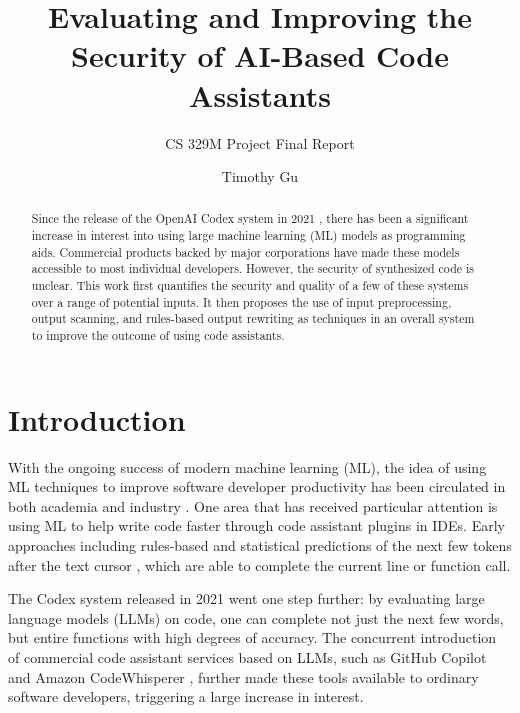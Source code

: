 \documentclass[sigplan,screen,nonacm]{acmart}
\begin{document}
\title{Evaluating and Improving the Security of AI-Based Code Assistants}
\subtitle{CS 329M Project Final Report}

\author{Timothy Gu}

\renewcommand{\shorttitle}{CS 329M Project Final Report}
\renewcommand{\shortauthors}{Gu}

\ifluatex
\renewcommand{\checkmark}{✔}
\fi

\begin{abstract}
    Since the release of the Open\-AI Codex system in 2021 \cite{Chen2021EvaluatingLL}, there has been a significant increase in interest into using large machine learning (ML) models as programming aids. Commercial products backed by major corporations have made these models accessible to most individual developers. However, the security of synthesized code is unclear. This work first quantifies the security and quality of a few of these systems over a range of potential inputs. It then proposes the use of input preprocessing, output scanning, and rules-based output rewriting as techniques in an overall system to improve the outcome of using code assistants.
\end{abstract}

\maketitle

\section{Introduction}

With the ongoing success of modern machine learning (ML), the idea of using ML techniques to improve software developer productivity has been circulated in both academia and industry \cite{pillars}. One area that has received particular attention is using ML to help write code faster through code assistant plugins in IDEs. Early approaches including rules-based and statistical predictions of the next few tokens after the text cursor \cite{kite-providers}, which are able to complete the current line or function call.

The Codex system released in 2021 \cite{Chen2021EvaluatingLL} went one step further: by evaluating large language models (LLMs) on code, one can complete not just the next few words, but entire functions with high degrees of accuracy. The concurrent introduction of commercial code assistant services based on LLMs, such as Git\-Hub Copilot \cite{copilot-announce} and Amazon Code\-Whis\-per\-er \cite{codewhisperer-announce-science}, further made these tools available to ordinary software developers, triggering a large increase in interest.
\end{document}
